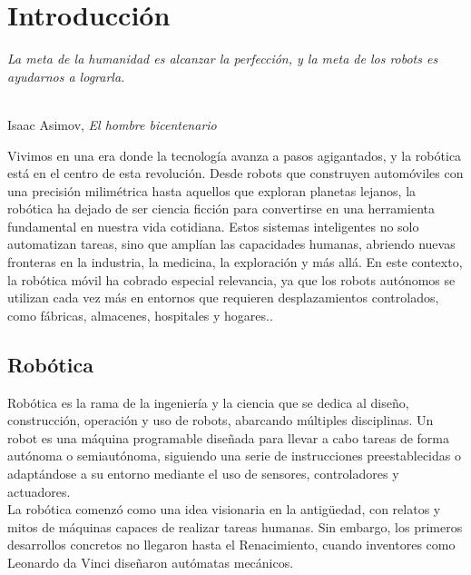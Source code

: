 \chapter{Introducción}
\label{cap:capitulo1}
\setcounter{page}{1}

\begin{flushright}
\begin{minipage}[]{10cm}
\emph{La meta de la humanidad es alcanzar la perfección, y la meta de los robots es ayudarnos a lograrla.}\\
\end{minipage}\\

Isaac Asimov, \textit{El hombre bicentenario}\\
\end{flushright}

\vspace{1cm}

Vivimos en una era donde la tecnología avanza a pasos agigantados, y la robótica está en el centro de esta revolución. Desde robots que construyen automóviles con una precisión milimétrica hasta aquellos que exploran planetas lejanos, la robótica ha dejado de ser ciencia ficción para convertirse en una herramienta fundamental en nuestra vida cotidiana. Estos sistemas inteligentes no solo automatizan tareas, sino que amplían las capacidades humanas, abriendo nuevas fronteras en la industria, la medicina, la exploración y más allá. En este contexto, la robótica móvil ha cobrado especial relevancia, ya que los robots autónomos se utilizan cada vez más en entornos que requieren desplazamientos controlados, como fábricas, almacenes, hospitales y hogares..\\

\section{Robótica}
\label{sec:miseccion} %

Robótica es la rama de la ingeniería y la ciencia que se dedica al diseño, construcción, operación y uso de robots, abarcando múltiples disciplinas. Un robot es una máquina programable diseñada para llevar a cabo tareas de forma autónoma o semiautónoma, siguiendo una serie de instrucciones preestablecidas o adaptándose a su entorno mediante el uso de sensores, controladores y actuadores. \\

La robótica comenzó como una idea visionaria en la antigüedad, con relatos y mitos de máquinas capaces de realizar tareas humanas. Sin embargo, los primeros desarrollos concretos no llegaron hasta el Renacimiento, cuando inventores como Leonardo da Vinci diseñaron autómatas mecánicos. \\

